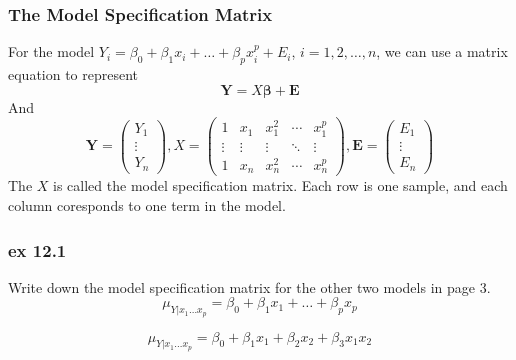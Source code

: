 \documentclass{beamer}
\begin{document}
\begin{frame}
    \frametitle{The Model Specification Matrix}

    For the model $Y_i=\beta_0+\beta_1 x_i+\dots +\beta_p x_i^p + E_i$, $i=1,2,\dots , n$, we can use a matrix equation to represent
    \[\mathbf{Y}=X\boldsymbol{\beta}+\mathbf{E}\]
    And 
    \begin{equation*}      
        \mathbf{Y}=
        \left( 
          \begin{array}{ccc}  
        
            Y_1\\
            \vdots\\
            Y_n
          \end{array}
        \right)   
        , X=
        \left(
        \begin{array}{ccccc}
            1 & x_1 & x_1^2 & \cdots & x_1^p\\
            \vdots & \vdots & \vdots & \ddots & \vdots\\
            1 & x_n & x_n^2 & \cdots & x_n^p
        \end{array}
        \right)
        , \mathbf{E}=
        \left(
            \begin{array}{ccc}  
        
                E_1\\
                \vdots\\
                E_n
              \end{array}
        \right)
    \end{equation*}
    The $X$ is called the model specification matrix. Each row is one sample, and each column coresponds to one term in the model.

\end{frame}

\begin{frame}
    \frametitle{ex 12.1}

    Write down the model specification matrix for the other two models in page 3.
    \[\mu_{Y|x_1\dots x_p}=\beta_0+\beta_1 x_1+\dots +\beta_p x_p\]

    \[\mu_{Y|x_1\dots x_p}=\beta_0+\beta_1 x_1+\beta_2 x_2+\beta_3 x_1 x_2\]

\end{frame}
\end{document}
